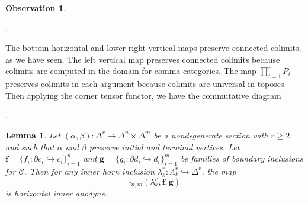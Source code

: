 \documentclass[a4paper]{article}
\numberwithin{equation}{subsection}
\theoremstyle{plain}   %
\newtheorem{lemma}[equation]{Lemma}
\theoremstyle{definition}
\newtheorem{obs}[equation]{Observation}
\theoremstyle{remark}
\theoremstyle{plain}
\DeclareMathOperator{\id}{id}
\newcommand{\overcat}[2]{{\left(#1\downarrow #2\right)}}
\newcommand{\psh}[1]{\ensuremath{\widehat{#1}}}
\providecommand{\C}{}
\renewcommand{\C}{\ensuremath{\mathcal{C}}}
\newcommand{\cellset}{\ensuremath{\widehat{\Theta[\mathcal{C}]}}}
\begin{document}
\begin{obs}
\begin{center}
.
	\end{center}
	The bottom horizontal and lower right vertical maps preserve connected colimits, as we have seen.  The left vertical map preserves connected colimits because colimits are computed in the domain for comma categories.  The map \(\prod_{i=1}^r P_i\) preserves colimits in each argument because colimits are universal in toposes. 
	Then applying the corner tensor functor, we have the commutative diagram
	\begin{center}
		.
	\end{center}
\end{obs}
\begin{lemma}\label{anodynelemma}
	Let \((\alpha,\beta): \Delta^r \to \Delta^n\times \Delta^m\) be a nondegenerate section with \(r\geq 2\) and such that \(\alpha\) and \(\beta\) preserve initial and terminal vertices. Let \(\mathbf{f}=\{f_i:\partial c_i \hookrightarrow c_i\}_{i=1}^n\) and \(\mathbf{g}=\{g_i:\partial d_i \hookrightarrow d_i\}_{i=1}^m\) be families of boundary inclusions for \(\C\).  Then for any inner horn inclusion \(\lambda^r_k: \Lambda^r_k\hookrightarrow \Delta^r\), the map
	\[
		\square^\lrcorner_{n,m}(\lambda^r_k, \mathbf{f},\mathbf{g})
	\]
	is horizontal inner anodyne.
\end{lemma}
\end{document}
